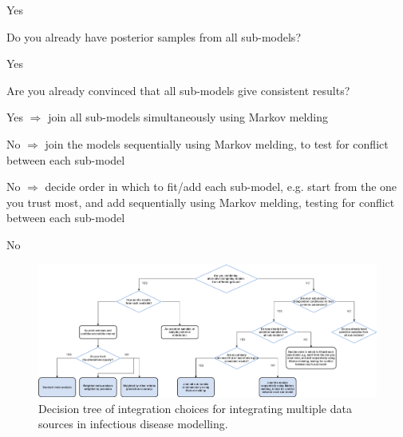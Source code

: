 \documentclass{article}
\begin{document}
\begin{tree}
\begin{tree}
\begin{tree}
        \begin{tree}
            \item Yes
            \begin{tree}
                \item Do you already have posterior samples from all sub-models?
                \begin{tree}
                    \item Yes
                    \begin{tree}
                        \item Are you already convinced that all sub-models give consistent results?
                        \begin{tree}
                            \item Yes $\Rightarrow$ join all sub-models simultaneously using Markov melding
                            \item No $\Rightarrow$ join the models sequentially using Markov melding, to test for conflict between each sub-model
                        \end{tree}
                    \end{tree}
                    \item No $\Rightarrow$ decide order in which to fit/add each sub-model, e.g. start from the one you trust most, and add sequentially using Markov melding, testing for conflict between each sub-model
                \end{tree}
            \end{tree}
            \item No
        \end{tree}
        \end{tree}
    \end{tree}
\end{tree}

\begin{figure}[htbp]
    \centering
    \includegraphics[width=\textwidth]{figures/integration choices decision tree.drawio.png}
    \caption{Decision tree of integration choices for integrating multiple data sources in infectious disease modelling.}
    \label{fig:fitting}
\end{figure}
\end{document}

